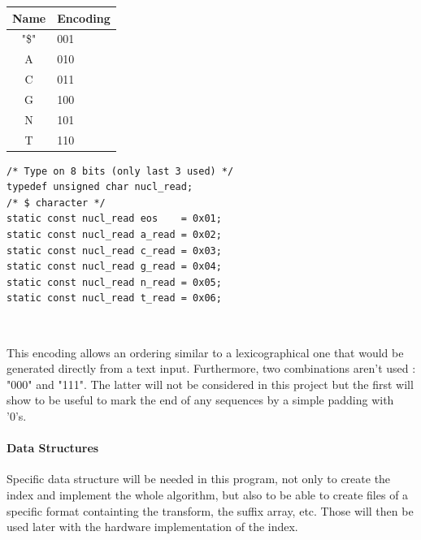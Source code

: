 \begin{minipage}[c]{0.35\textwidth}
\vspace*{6mm}
	\begin{tabular}{|c|l|}
	\hline
		Name & Encoding \\
		\hline 
		"\$" & 001 \\
		A & 010 \\
		C & 011 \\
		G & 100 \\
		N & 101 \\
		T & 110 \\
    \hline
	\end{tabular}
\end{minipage}
\begin{minipage}[t]{0.85\textwidth}
\vspace*{-30mm}
    \begin{verbatim}
/* Type on 8 bits (only last 3 used) */
typedef unsigned char nucl_read; 
/* $ character */
static const nucl_read eos    = 0x01;	
static const nucl_read a_read = 0x02;
static const nucl_read c_read = 0x03;
static const nucl_read g_read = 0x04;
static const nucl_read n_read = 0x05;
static const nucl_read t_read = 0x06;
    \end{verbatim}
\begin{lstlisting}


\end{lstlisting}
\end{minipage}
\vspace*{3mm}

This encoding allows an ordering similar to a lexicographical one that would be generated directly from a text input. Furthermore, two combinations aren't used : \textrm{"000"} and \textrm{"111"}. The latter will not be considered in this project but the first will show to be useful to mark the end of any sequences by a simple padding with \textrm{'0's}.

\paragraph{Data Structures}

Specific data structure will be needed in this program, not only to create the index and implement the whole algorithm, but also to be able to create files of a specific format containting the transform, the suffix array, etc. Those will then be used later with the hardware implementation of the index.

